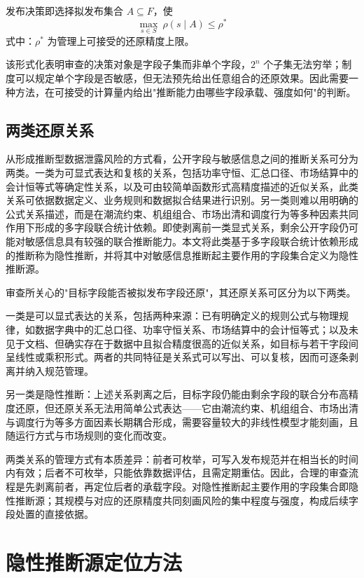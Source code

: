 \documentclass[UTF8,zihao=5,twoside,fontset=none]{ctexart}
\begin{document}
发布决策即选择拟发布集合 $A\subseteq F$，使
\begin{equation}
\max_{s\in S}\ \rho(s\mid A)\le \rho^{\ast}
\end{equation}
式中：$\rho^{\ast}$ 为管理上可接受的还原精度上限。

该形式化表明审查的决策对象是字段子集而非单个字段，$2^n$ 个子集无法穷举；制度可以规定单个字段是否敏感，但无法预先给出任意组合的还原效果。因此需要一种方法，在可接受的计算量内给出"推断能力由哪些字段承载、强度如何"的判断。

\subsection{两类还原关系}

从形成推断型数据泄露风险的方式看，公开字段与敏感信息之间的推断关系可分为两类。一类为可显式表达和复核的关系，包括功率守恒、汇总口径、市场结算中的会计恒等式等确定性关系，以及可由较简单函数形式高精度描述的近似关系，此类关系可依据数据定义、业务规则和数据拟合结果进行识别。另一类则难以用明确的公式关系描述，而是在潮流约束、机组组合、市场出清和调度行为等多种因素共同作用下形成的多字段联合统计依赖。即使剥离前一类显式关系，剩余公开字段仍可能对敏感信息具有较强的联合推断能力。本文将此类基于多字段联合统计依赖形成的推断称为隐性推断，并将其中对敏感信息推断起主要作用的字段集合定义为隐性推断源。

审查所关心的"目标字段能否被拟发布字段还原"，其还原关系可区分为以下两类。

一类是可以显式表达的关系，包括两种来源：已有明确定义的规则公式与物理规律，如数据字典中的汇总口径、功率守恒关系、市场结算中的会计恒等式；以及未见于文档、但确实存在于数据中且拟合精度很高的近似关系，如目标与若干字段间呈线性或乘积形式。两者的共同特征是关系式可以写出、可以复核，因而可逐条剥离并纳入规范管理。

另一类是隐性推断：上述关系剥离之后，目标字段仍能由剩余字段的联合分布高精度还原，但还原关系无法用简单公式表达——它由潮流约束、机组组合、市场出清与调度行为等多方面因素长期耦合形成，需要容量较大的非线性模型才能刻画，且随运行方式与市场规则的变化而改变。

两类关系的管理方式有本质差异：前者可枚举，可写入发布规范并在相当长的时间内有效；后者不可枚举，只能依靠数据评估，且需定期重估。因此，合理的审查流程是先剥离前者，再定位后者的承载字段。对隐性推断起主要作用的字段集合即隐性推断源；其规模与对应的还原精度共同刻画风险的集中程度与强度，构成后续字段处置的直接依据。

\section{隐性推断源定位方法}
\end{document}
